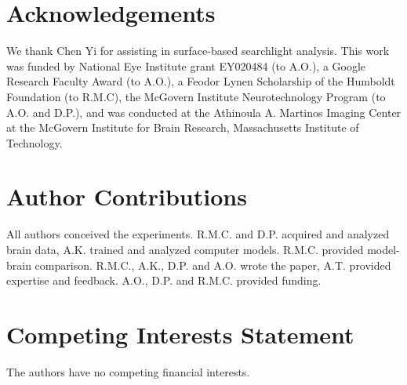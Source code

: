 \documentclass[10pt,twocolumn,letterpaper]{article}
\begin{document}
\section*{Acknowledgements}
We thank Chen Yi for assisting in surface-based searchlight analysis. This work was funded by National Eye Institute grant EY020484 (to A.O.), a Google Research Faculty Award (to A.O.), a Feodor Lynen Scholarship of the Humboldt Foundation (to R.M.C), the McGovern Institute Neurotechnology Program (to A.O. and D.P.), and was conducted at the Athinoula A. Martinos Imaging Center at the McGovern Institute for Brain Research, Massachusetts Institute of Technology.


\section*{Author Contributions}
All authors conceived the experiments. R.M.C. and D.P. acquired and analyzed brain data, A.K. trained and analyzed computer models. R.M.C. provided model-brain comparison. R.M.C., A.K., D.P. and A.O. wrote the paper, A.T. provided expertise and feedback. A.O., D.P. and R.M.C. provided funding.

\section*{Competing Interests Statement}
The authors have no competing financial interests.

{\small


}
\end{document}
